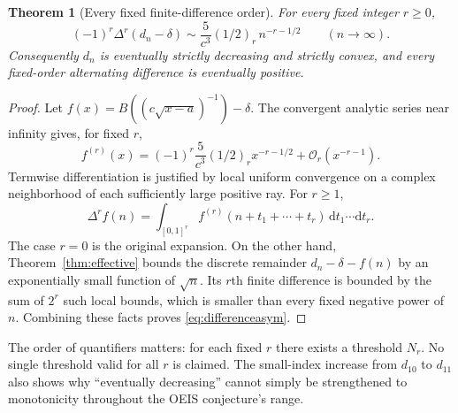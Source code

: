 \documentclass[11pt]{article}
\numberwithin{equation}{section}
\newtheorem{theorem}{Theorem}[section]
\theoremstyle{definition}
\theoremstyle{remark}
\newcommand{\OO}{\mathcal O}
\newcommand{\dd}{\mathrm d}
\begin{document}
\begin{theorem}[Every fixed finite-difference order]\label{thm:differences}
For every fixed integer $r\ge0$,
\begin{equation}\label{eq:differenceasym}
 (-1)^r\Delta^r(d_n-\delta)
 \sim\frac5{c^3}(1/2)_r\,n^{-r-1/2}
 \qquad(n\to\infty).
\end{equation}
Consequently $d_n$ is eventually strictly decreasing and strictly
convex, and every fixed-order alternating difference is eventually
positive.
\end{theorem}
\begin{proof}
Let $f(x)=B((c\sqrt{x-a})^{-1})-\delta$. The convergent analytic
series near infinity gives, for fixed $r$,
\[
 f^{(r)}(x)=(-1)^r\frac5{c^3}(1/2)_r x^{-r-1/2}
 +\OO_r(x^{-r-1}).
\]
Termwise differentiation is justified by local uniform convergence on
a complex neighborhood of each sufficiently large positive ray. For
$r\ge1$,
\[
 \Delta^r f(n)=\int_{[0,1]^r}
 f^{(r)}(n+t_1+\cdots+t_r)\,\dd t_1\cdots\dd t_r.
\]
The case $r=0$ is the original expansion. On the other hand,
Theorem~\ref{thm:effective} bounds the discrete remainder
$d_n-\delta-f(n)$ by an exponentially small function of $\sqrt n$.
Its $r$th finite difference is bounded by the sum of $2^r$ such local
bounds, which is smaller than every fixed negative power of $n$.
Combining these facts proves \eqref{eq:differenceasym}.
\end{proof}

The order of quantifiers matters: for each fixed $r$ there exists a
threshold $N_r$. No single threshold valid for all $r$ is claimed.
The small-index increase from $d_{10}$ to $d_{11}$ also shows why
``eventually decreasing'' cannot simply be strengthened to monotonicity
throughout the OEIS conjecture's range.
\end{document}
